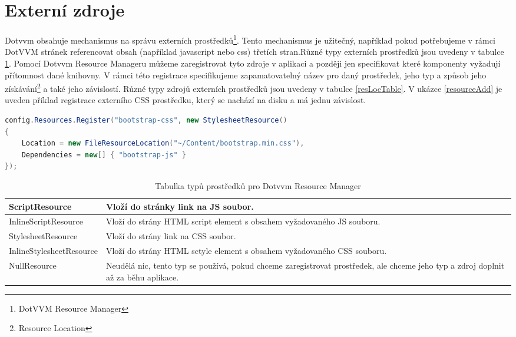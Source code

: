\section{Externí zdroje}
Dotvvm obsahuje mechanismus na správu externích prostředků\footnote{DotVVM Resource Manager}. Tento mechanismus je užitečný, například pokud potřebujeme v rámci DotVVM stránek referencovat obsah (například javascript nebo css) třetích stran.Různé typy externích prostředků jsou uvedeny v tabulce \ref{resTypeTable}. Pomocí Dotvvm Resource Manageru můžeme zaregistrovat tyto zdroje v aplikaci a později jen specifikovat které komponenty vyžadují přítomnost dané knihovny. V rámci této registrace specifikujeme zapamatovatelný název pro daný prostředek, jeho typ a způsob jeho získávání\footnote{ Resource Location } a také jeho závislostí. Různé typy zdrojů externích prostředků jsou uvedeny v tabulce \ref{resLocTable}.  V ukázce \ref{resourceAdd} je uveden příklad registrace externího CSS prostředku, který se nachází na disku a má jednu závislost.

\begin{lstlisting}[language=c#, caption=Registrace CSS,label=resourceAdd,captionpos=t]
config.Resources.Register("bootstrap-css", new StylesheetResource()
{
    Location = new FileResourceLocation("~/Content/bootstrap.min.css"),
    Dependencies = new[] { "bootstrap-js" }
});
\end{lstlisting}

\begin{table}[H]
	\caption{Tabulka typů prostředků pro Dotvvm Resource Manager}
	\label{resTypeTable}
	\centering
	\begin{tabular}{m{12em}|m{22em}}
		\toprule
ScriptResource           & Vloží do stránky link na JS soubor. \\ \midrule
InlineScriptResource     & Vloží do strány HTML script element s obsahem vyžadovaného JS souboru. \\ \midrule
StylesheetResource       & Vloží do strány link na CSS soubor. \\ \midrule
InlineStylesheetResource & Vloží do strány HTML sctyle element s obsahem vyžadovaného CSS souboru. \\ \midrule
NullResource             & Neudělá nic, tento typ se používá, pokud chceme zaregistrovat prostředek, ale chceme jeho typ a zdroj doplnit až za běhu aplikace. \\
\bottomrule
\end{tabular}
\end{table}

